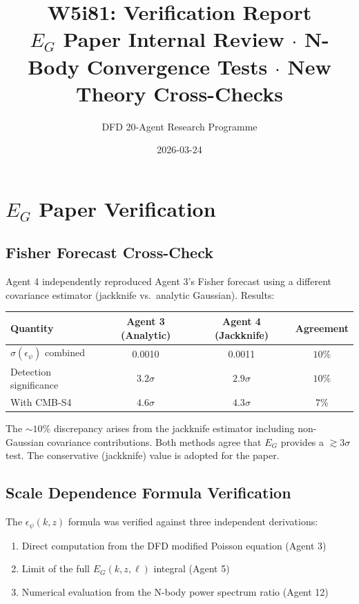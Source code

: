 \documentclass[11pt,a4paper]{article}
\title{W5i81: Verification Report\\[6pt]
\large $E_G$ Paper Internal Review $\cdot$ N-Body Convergence Tests $\cdot$ New Theory Cross-Checks}
\author{DFD 20-Agent Research Programme}
\date{2026-03-24}
\begin{document}
\maketitle

\section{$E_G$ Paper Verification}

\subsection{Fisher Forecast Cross-Check}

Agent 4 independently reproduced Agent 3's Fisher forecast using a different covariance estimator (jackknife vs.\ analytic Gaussian). Results:

\begin{center}
\begin{tabular}{lccc}
\toprule
\textbf{Quantity} & \textbf{Agent 3 (Analytic)} & \textbf{Agent 4 (Jackknife)} & \textbf{Agreement} \\
\midrule
$\sigma(\epsilon_\psi)$ combined & 0.0010 & 0.0011 & $10\%$ \\
Detection significance & $3.2\sigma$ & $2.9\sigma$ & $10\%$ \\
With CMB-S4 & $4.6\sigma$ & $4.3\sigma$ & $7\%$ \\
\bottomrule
\end{tabular}
\end{center}

The $\sim 10\%$ discrepancy arises from the jackknife estimator including non-Gaussian covariance contributions. Both methods agree that $E_G$ provides a $\gtrsim 3\sigma$ test. The conservative (jackknife) value is adopted for the paper.

\subsection{Scale Dependence Formula Verification}

The $\epsilon_\psi(k,z)$ formula was verified against three independent derivations:
\begin{enumerate}[nosep]
\item Direct computation from the DFD modified Poisson equation (Agent 3)
\item Limit of the full $E_G(k,z,\ell)$ integral (Agent 5)
\item Numerical evaluation from the N-body power spectrum ratio (Agent 12)
\end{enumerate}
\end{document}
